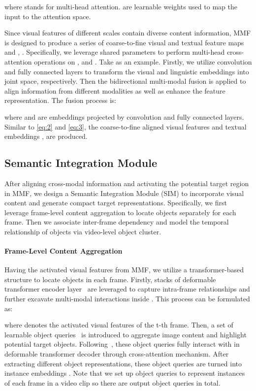 \documentclass{article}
\begin{document}
where  stands for multi-head attention. 
 are learnable weights used to map the input to the attention space.

Since visual features of different scales contain diverse content information, MMF is designed to produce a series of coarse-to-fine visual and textual feature maps  and , . Specifically, we leverage shared parameters to perform multi-head cross-attention operations on ,  and . 
Take  as an example. 
Firstly, we utilize  convolution and fully connected layers to transform the visual and linguistic embeddings into joint space, respectively. Then the bidirectional multi-modal fusion is applied to align information from different modalities as well as enhance the feature representation. The fusion process is:

where  and   are embeddings projected by convolution and fully connected layers.
Similar to \cref{eq:2} and \cref{eq:3}, the coarse-to-fine aligned visual features  and textual embeddings ,  are produced.

\subsection{Semantic Integration Module
}
After aligning cross-modal information and activating the potential target region in MMF, we design a Semantic Integration Module (SIM) to incorporate visual content and generate compact target representations. Specifically, we first leverage frame-level content aggregation to locate objects separately for each frame. Then we associate inter-frame dependency and model the temporal relationship of objects via video-level object cluster.

\vspace{-5pt}
\paragraph{Frame-Level Content Aggregation}
Having the activated visual features  from MMF, we utilize a transformer-based structure to locate objects in each frame. 
Firstly,  stacks of deformable transformer encoder layer~\cite{deformabledetr} are leveraged to capture intra-frame relationships and further excavate multi-modal interactions inside .
This process can be formulated as:

where  denotes the activated visual features of the t-th frame.
Then, a set of learnable object queries~\cite{detr, deformabledetr} is introduced to aggregate image content and highlight potential target objects. 
Following~\cite{referformer}, these object queries fully interact with  in deformable transformer decoder through cross-attention mechanism.
After extracting different object representations, these object queries are turned into instance embeddings .
Note that we set up  object queries to represent instances of each frame in a video clip so there are  output object queries in total.
\end{document}
